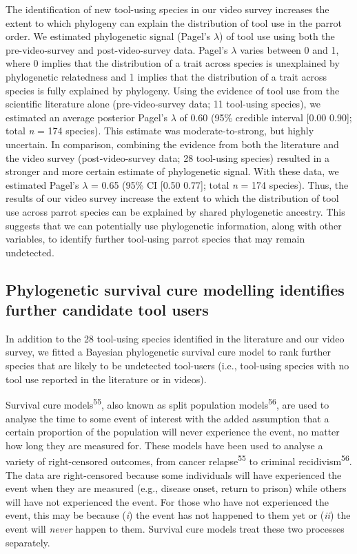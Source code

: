 \documentclass[
  man, donotrepeattitle,floatsintext]{apa6}
\begin{document}
The identification of new tool-using species in our video survey increases the
extent to which phylogeny can explain the distribution of tool use in the parrot
order. We estimated phylogenetic signal (Pagel's \(\lambda\)) of tool use using
both the pre-video-survey and post-video-survey data. Pagel's \(\lambda\) varies
between 0 and 1, where 0 implies that the distribution of a trait across species
is unexplained by phylogenetic relatedness and 1 implies that the distribution
of a trait across species is fully explained by phylogeny. Using the evidence of
tool use from the scientific literature alone (pre-video-survey data; 11
tool-using species), we estimated an average posterior Pagel's \(\lambda\) of
0.60 (95\% credible interval {[}0.00
0.90{]}; total \emph{n} =
174 species). This estimate was moderate-to-strong, but highly
uncertain. In comparison, combining the evidence from both the literature and
the video survey (post-video-survey data; 28 tool-using species) resulted in a
stronger and more certain estimate of phylogenetic signal. With these data, we
estimated Pagel's \(\lambda\) = 0.65 (95\% CI
{[}0.50
0.77{]}; total \emph{n} =
174 species). Thus, the results of our video survey increase
the extent to which the distribution of tool use across parrot species can be
explained by shared phylogenetic ancestry. This suggests that we can potentially
use phylogenetic information, along with other variables, to identify further
tool-using parrot species that may remain undetected.

\hypertarget{phylogenetic-survival-cure-modelling-identifies-further-candidate-tool-users}{%
\subsection{Phylogenetic survival cure modelling identifies further candidate tool users}\label{phylogenetic-survival-cure-modelling-identifies-further-candidate-tool-users}}

In addition to the 28 tool-using species identified in the literature and our
video survey, we fitted a Bayesian phylogenetic survival cure model to rank
further species that are likely to be undetected tool-users (i.e., tool-using
species with no tool use reported in the literature or in videos).

Survival cure models\textsuperscript{55}, also known as split population
models\textsuperscript{56}, are used to analyse the time to some event of interest
with the added assumption that a certain proportion of the population will never
experience the event, no matter how long they are measured for. These models
have been used to analyse a variety of right-censored outcomes, from cancer
relapse\textsuperscript{55} to criminal recidivism\textsuperscript{56}. The data are
right-censored because some individuals will have experienced the event when
they are measured (e.g., disease onset, return to prison) while others will have
not experienced the event. For those who have not experienced the event, this
may be because (\emph{i}) the event has not happened to them yet or (\emph{ii}) the event
will \emph{never} happen to them. Survival cure models treat these two processes
separately.
\end{document}
